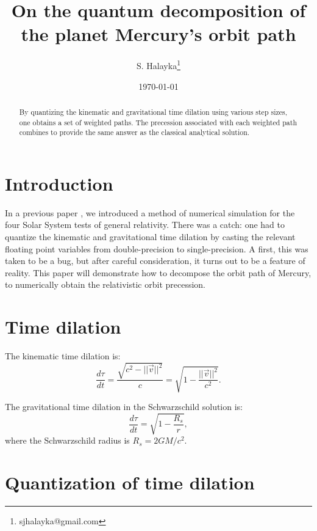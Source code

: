 \documentclass[12pt]{article}
\title{On the quantum decomposition of the planet Mercury's orbit path}
\author{S. Halayka\footnote{sjhalayka@gmail.com}}
\date{\today\;\currenttime}
\begin{document}
 
\maketitle

\begin{abstract}
By quantizing the kinematic and gravitational time dilation using various step sizes, one obtains a set of weighted paths.
The precession associated with each weighted path combines to provide the same answer as the classical analytical solution.
\end{abstract}





\section{Introduction}

In a previous paper \cite{halayka}, we introduced a method of numerical simulation for the four Solar System tests of general relativity.
There was a catch: one had to quantize the kinematic and gravitational time dilation by casting the relevant floating point variables from double-precision to single-precision.
A first, this was taken to be a bug, but after careful consideration, it turns out to be a feature of reality.
This paper will demonstrate how to decompose the orbit path of Mercury, to numerically obtain the relativistic orbit precession.




\section{Time dilation}

The kinematic time dilation is:
\begin{equation}
\label{eq_intro_kinematic}
\frac{d\tau}{dt} = \frac{\sqrt{c^2 - \lvert\lvert \vec{v}\rvert\rvert^2}}{c} = \sqrt{1 - \frac{\lvert\lvert \vec{v}\rvert\rvert^2}{c^2}}.
\end{equation}

The gravitational time dilation in the Schwarzschild solution is:
\begin{equation}
\label{eq_intro_gravitational}
\frac{d\tau}{dt} = \sqrt{1 - \frac{R_s}{r}},
\end{equation}
where the Schwarzschild radius is $R_s = 2GM/c^2$.



\section{Quantization of time dilation}
\end{document}
